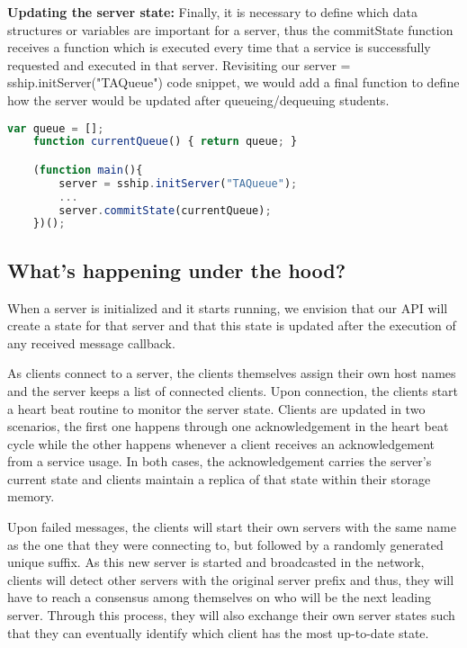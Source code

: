 {\bf Updating the server state: } Finally, it is necessary to define which data structures or variables are important for a server, thus the {\ttfamily commitState} function receives a function which is executed every time that a service is successfully requested and executed in that server. Revisiting our {\ttfamily server = sship.initServer("TAQueue")} code snippet, we would add a final function to define how the server would be updated after queueing/dequeuing students.

\begin{lstlisting}[language=JavaScript]
    var queue = [];
    function currentQueue() { return queue; }

    (function main(){
        server = sship.initServer("TAQueue");
        ...
        server.commitState(currentQueue);
    })();
\end{lstlisting}


\subsection{What's happening under the hood?}

When a server is initialized and it starts running, we envision that our API will create a state for that server and that this state is updated after the execution of any received message callback. 

As clients connect to a server, the clients themselves assign their own host names and the server keeps a list of connected clients. Upon connection, the clients start a heart beat routine to monitor the server state. Clients are updated in two scenarios, the first one happens through one acknowledgement in the heart beat cycle while the other happens whenever a client receives an acknowledgement from a service usage. In both cases, the acknowledgement carries the server's current state and clients maintain a replica of that state within their storage memory.

Upon failed messages, the clients will start their own servers with the same name as the one that they were connecting to, but followed by a randomly generated unique suffix. As this new server is started and broadcasted in the network, clients will detect other servers with the original server prefix and thus, they will have to reach a consensus among themselves on who will be the next leading server. Through this process, they will also exchange their own server states such that they can eventually identify which client has the most up-to-date state.